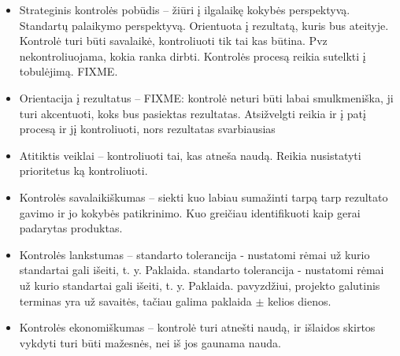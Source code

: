 \begin{itemize}
  \item Strateginis kontrolės pobūdis – žiūri į ilgalaikę kokybės perspektyvą. Standartų palaikymo perspektyvą. Orientuota į rezultatą, kuris bus ateityje. Kontrolė turi būti savalaikė, kontroliuoti tik tai kas būtina. Pvz nekontroliuojama, kokia ranka dirbti. Kontrolės procesą reikia sutelkti į tobulėjimą. FIXME.
  \item Orientacija į rezultatus – FIXME: kontrolė neturi būti labai smulkmeniška, ji turi akcentuoti, koks bus pasiektas rezultatas. Atsižvelgti reikia ir į patį procesą ir jį kontroliuoti, nors rezultatas svarbiausias
  \item Atitiktis veiklai – kontroliuoti tai, kas atneša naudą.  Reikia nusistatyti prioritetus ką kontroliuoti.
  \item Kontrolės savalaikiškumas – siekti kuo labiau sumažinti tarpą
    tarp rezultato gavimo ir jo kokybės patikrinimo. Kuo greičiau identifikuoti kaip gerai padarytas produktas.
  \item Kontrolės lankstumas – standarto tolerancija - nustatomi rėmai už kurio standartai gali išeiti, t. y. Paklaida. standarto tolerancija - nustatomi rėmai už kurio standartai gali išeiti, t. y. Paklaida. pavyzdžiui, projekto galutinis terminas yra už savaitės, tačiau galima paklaida 
    $\pm$ kelios dienos.
  \item Kontrolės ekonomiškumas – kontrolė turi atnešti naudą, ir išlaidos
    skirtos vykdyti turi būti mažesnės, nei iš jos gaunama nauda.
\end{itemize}

